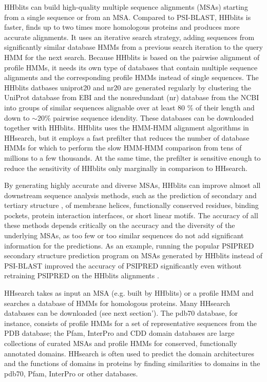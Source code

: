 \documentclass[11pt,a4paper]{article}
\begin{document}
HHblits can build high-quality multiple sequence alignments (MSAs) starting from a single sequence or from an MSA. Compared to PSI-BLAST, HHblits is faster, finds up to two times more homologous proteins and produces more accurate alignments. It uses an iterative search strategy, adding sequences from significantly similar database HMMs from a previous search iteration to the query HMM for the next search. Because HHblits is based on the pairwise alignment of profile HMMs, it needs its own type of databases that contain multiple sequence alignments and the corresponding profile HMMs instead of single sequences. The HHblits datbases uniprot20 and nr20 are generated regularly by clustering the UniProt database from EBI and the nonredundant (nr) database from the NCBI into groups of similar sequences alignable over at least 80 \% of their length and down to $\sim 20 \%$ pairwise sequence idendity. These databases can be downloaded together with HHblits. HHblits uses the HMM-HMM alignment algorithms in HHsearch, but it employs a fast prefilter that reduces the number of database HMMs for which to perform the slow HMM-HMM comparison from tens of millions to a few thousands. At the same time, the prefilter is sensitive enough to reduce the sensitivity of HHblits only marginally in comparison to HHsearch. 

By generating highly accurate and diverse MSAs, HHblits can improve almost all downstream sequence analysis methods, such as the prediction of secondary and tertiary structure \cite{Jones:1999, Marks:2011}, of membrane helices, functionally conserved residues, binding pockets, protein interaction interfaces, or short linear motifs. The accuracy of all these methods depends critically on the accuracy and the diversity of the underlying MSAs, as too few or too similar sequences do not add significant information for the predictions. As an example, running the popular PSIPRED secondary structure prediction program \cite{Jones:1999} on MSAs generated by HHblits instead of PSI-BLAST improved the accuracy of PSIPRED significantly even without retraining PSIPRED on the HHblits alignments \cite{Remmert:2011}. 

HHsearch takes as input an MSA (e.g. built by HHblits) or a profile HMM and searches a database of HMMs for homologous proteins. Many HHsearch databases can be downloaded (see next section'). The pdb70 database, for instance, consists of profile HMMs for a set of representative sequences from the PDB database; the Pfam, InterPro and CDD domain databases are large collections of curated MSAs and profile HMMs for conserved, functionally annotated domains. HHsearch is often used to predict the domain architectures and the functions of domains in proteins by finding similarities to domains in the pdb70, Pfam, InterPro or other databases. 
\end{document}
